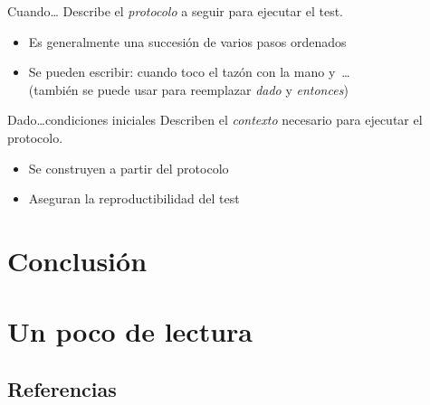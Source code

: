   \begin{frame}{\insertsubsection}
    \begin{block}{Cuando\dots}
      Describe el \alert{\emph{protocolo}} a seguir para ejecutar el test.
    \end{block}
    \begin{block}{}
      \begin{itemize}
        \item Es generalmente una succesión de varios pasos ordenados
        \item Se pueden escribir: \alert{cuando} toco el tazón con la mano \alert{y}~\dots\\
        (también se puede usar para reemplazar \emph{dado} y \emph{entonces})
      \end{itemize}
    \end{block}
  \end{frame}

  \begin{frame}{\insertsubsection}
    \begin{block}{Dado\dots \alert{condiciones iniciales}}
      Describen el \emph{contexto} necesario para ejecutar el protocolo.
    \end{block}
    \begin{block}{}
      \begin{itemize}
        \item Se construyen a partir del protocolo
        \item Aseguran la \alert{reproductibilidad} del test
      \end{itemize}
    \end{block}
  \end{frame}

\section*{Conclusión}

  \begin{frame}{\insertsection}
  \end{frame}

\appendix

\section{Un poco de lectura}

%
\subsection{Referencias}

